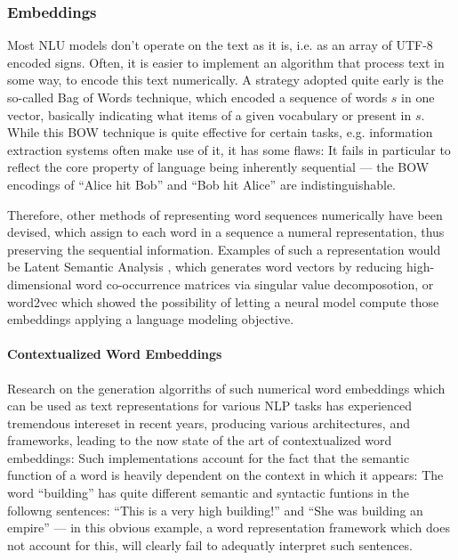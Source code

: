 \subsubsection*{Embeddings}


Most NLU models don't operate on the text as it is, i.e. as an array of UTF-8 encoded
signs. Often, it is easier to implement an algorithm that process text in some way, to
encode this text numerically. A strategy adopted quite early is the so-called Bag of
Words \citep{harris1954distributional} technique, which encoded a sequence of words $s$
in one vector, basically indicating what items of a given vocabulary or present in $s$.
While this BOW technique is quite effective for certain tasks, e.g. information extraction
systems often make use of it, it has some flaws: It fails in particular to reflect the core
property of language being inherently sequential --- the BOW encodings of ``Alice hit Bob''
and ``Bob hit Alice'' are indistinguishable.

Therefore, other methods of representing word sequences numerically have been devised, which assign
to each word in a sequence a numeral representation, thus preserving the sequential information.
Examples of such a representation would be Latent Semantic Analysis \citep{furnas1988using}, which
generates word vectors by reducing high-dimensional word co-occurrence matrices via singular value
decomposotion, or word2vec \citep{mikolov2013distributed} which showed the possibility of letting a
neural model compute those embeddings applying a language modeling objective.



\paragraph*{Contextualized Word Embeddings}

Research on the generation algorriths of such numerical word embeddings which can
be used as text representations for various NLP tasks has experienced tremendous
intereset in recent years, producing various architectures, and frameworks, leading
to the now state of the art of contextualized word embeddings: Such implementations
account for the fact that the semantic function of a word is heavily dependent on
the context in which it appears: The word ``building'' has quite different semantic
and syntactic funtions in the followng sentences: ``This is a very high building!''
and ``She was building an empire'' --- in this obvious example, a word representation
framework which does not account for this, will clearly fail to adequatly interpret
such sentences.

